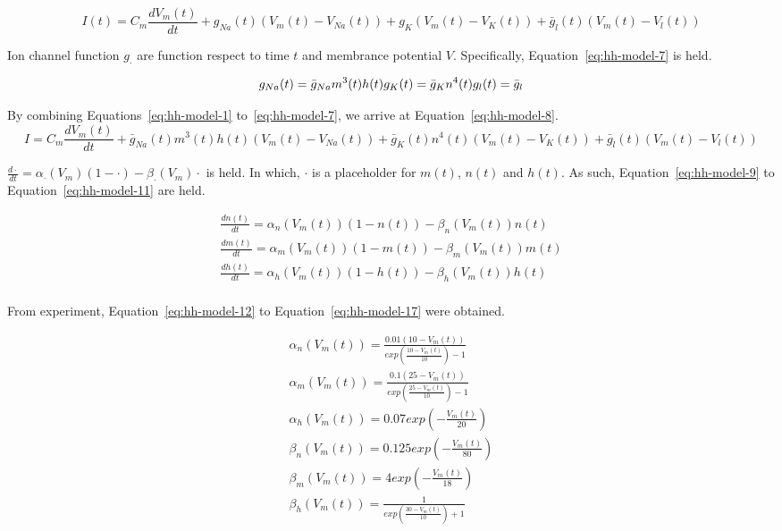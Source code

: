 \begin{equation}\label{eq:hh-model-6}
    I(t) = C_m\frac{dV_m(t)}{dt} + g_{Na}(t)(V_m(t) - V_{Na}(t)) + g_{K}(V_m(t) - V_{K}(t)) + 
        \bar g_{l}(t)(V_m(t) - V_{l}(t))
\end{equation}

Ion channel function $g_{\cdot}$ are function respect to time $t$ and membrance potential $V$.
Specifically, Equation~\ref{eq:hh-model-7} is held.

\begin{equation}\label{eq:hh-model-7}
    g_{Na}(t) = \bar g_{Na}m^3(t)h(t) \\
    g_{K}(t) = \bar g_{K}n^4(t) \\
    g_{l}(t) = \bar g_l \\
\end{equation}

By combining Equations~\ref{eq:hh-model-1} to~\ref{eq:hh-model-7}, we arrive at Equation~\ref{eq:hh-model-8}.
\begin{equation}\label{eq:hh-model-8}
    I = C_m\frac{dV_m(t)}{dt} + \bar g_{Na}(t)m^3(t)h(t)(V_m(t) - V_{Na}(t)) + 
    \bar g_{K}(t)n^4(t)(V_m(t) - V_{K}(t)) + \bar g_{l}(t)(V_m(t) - V_{l}(t))
\end{equation}

$\frac{d\cdot}{dt}= \alpha_\cdot(V_m)(1-\cdot)-\beta_\cdot(V_m)\cdot $ is held. 
In which, $\cdot$ is a placeholder for $m(t)$, $n(t)$ and $h(t)$. As such, Equation~\ref{eq:hh-model-9} to 
Equation~\ref{eq:hh-model-11} are held.

\begin{align}
    \frac{dn(t)}{dt}= \alpha_n(V_m(t))(1-n(t))-\beta_n(V_m(t))n(t) \label{eq:hh-model-9}  \\
    \frac{dm(t)}{dt}= \alpha_m(V_m(t))(1-m(t))-\beta_m(V_m(t))m(t) \label{eq:hh-model-10} \\
    \frac{dh(t)}{dt}= \alpha_h(V_m(t))(1-h(t))-\beta_h(V_m(t))h(t) \label{eq:hh-model-11} \\
\end{align}

From experiment, Equation~\ref{eq:hh-model-12} to Equation~\ref{eq:hh-model-17} were obtained.

\begin{align}
    \alpha_n(V_m(t)) = \frac{0.01(10 - V_m(t))}{exp(\frac{10-V_m(t)}{10}) - 1} \label{eq:hh-model-12}\\
    \alpha_m(V_m(t)) = \frac{0.1(25 - V_m(t))}{exp(\frac{25-V_m(t)}{10}) - 1} \label{eq:hh-model-13}\\
    \alpha_h(V_m(t)) = 0.07exp(-\frac{V_m(t)}{20}) \label{eq:hh-model-14}\\
    \beta_n(V_m(t)) = 0.125exp(-\frac{V_m(t)}{80}) \label{eq:hh-model-15}\\
    \beta_m(V_m(t)) = 4exp(-\frac{V_m(t)}{18}) \label{eq:hh-model-16}\\
    \beta_h(V_m(t)) = \frac{1}{exp(\frac{30-V_m(t)}{10})+1} \label{eq:hh-model-17}
\end{align}

